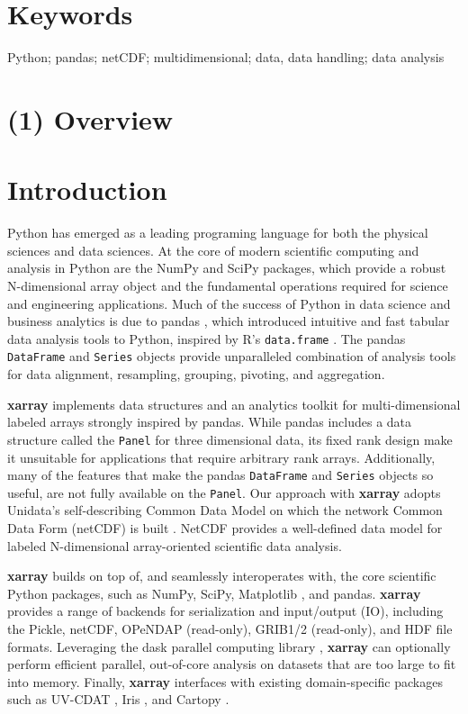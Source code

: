 \documentclass{jors}
\begin{document}
\section*{Keywords}

{Python; pandas; netCDF; multidimensional; data, data handling; data analysis}

\section*{(1) Overview}

\section*{Introduction}

Python has emerged as a leading programing language for both the physical sciences and data sciences.
At the core of modern scientific computing and analysis in Python are the NumPy \citep{Jones_2001} and SciPy \citep{van_der_Walt_2011} packages, which provide a robust N-dimensional array object and the fundamental operations required for science and engineering applications.
Much of the success of Python in data science and business analytics is due to pandas \citep{mckinney_2010}, which introduced intuitive and fast tabular data analysis tools to Python, inspired by R's \verb|data.frame| \citep{r_2013}.
The pandas \verb|DataFrame| and \verb|Series| objects provide unparalleled combination of analysis tools for data alignment, resampling, grouping, pivoting, and aggregation.

\textbf{xarray} implements data structures and an analytics toolkit for multi-dimensional labeled arrays strongly inspired by pandas.
While pandas includes a data structure called the \verb|Panel| for three dimensional data, its fixed rank design make it unsuitable for applications that require arbitrary rank arrays.
Additionally, many of the features that make the pandas \verb|DataFrame| and \verb|Series| objects so useful, are not fully available on the \verb|Panel|.
Our approach with \textbf{xarray} adopts Unidata’s self-describing Common Data Model on which the network Common Data Form (netCDF) is built \citep{Rew_1990,Brown_1993}.
NetCDF provides a well-defined data model for labeled N-dimensional array-oriented scientific data analysis.

\textbf{xarray} builds on top of, and seamlessly interoperates with, the core scientific Python packages, such as NumPy, SciPy, Matplotlib \citep{Hunter_2007}, and pandas.
\textbf{xarray} provides a range of backends for serialization and input/output (IO), including the Pickle, netCDF, OPeNDAP (read-only), GRIB1/2 (read-only), and HDF file formats.
Leveraging the dask parallel computing library \cite{dask}, \textbf{xarray} can optionally perform efficient parallel, out-of-core analysis on datasets that are too large to fit into memory.
Finally, \textbf{xarray} interfaces with existing domain-specific packages such as UV-CDAT \citep{uvcdat}, Iris \citep{Iris}, and Cartopy \citep{Cartopy}.
\end{document}
